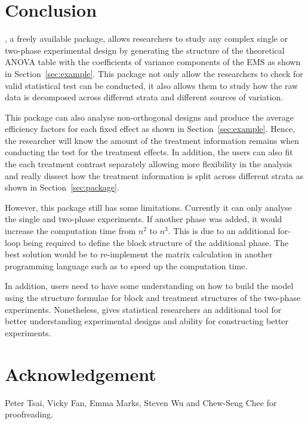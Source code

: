 \documentclass[article]{jss}
\begin{document}
\section[Conclusion]{Conclusion}
, a freely available  package, allows researchers to study any complex single or two-phase experimental design by generating the structure of the theoretical ANOVA table with the coefficients of variance components of the EMS as shown in Section~\ref{sec:example}. This package not only allow the researchers to check for valid statistical test can be conducted, it also allows them to study how the raw data is decomposed across different strata and different sources of variation.

This package can also analyse non-orthogonal designs and produce the average efficiency factors for each fixed effect as shown in Section~\ref{sec:example}. Hence, the researcher will know the amount of the treatment information remains when conducting the test for the treatment effects. In addition, the users can also fit the each treatment contrast separately allowing more flexibility in the analysis and really dissect how the treatment information is split across different strata as shown in Section~\ref{sec:package}.

However, this package still has some limitations. Currently it can only analyse the single and two-phase experiments. If another phase was added, it would increase the computation time from $n^2$ to $n^3$. This is due to an additional for-loop being required to define the block structure of the additional phase. The best solution would be to re-implement the matrix calculation in another programming language such as  to speed up the computation time.

In addition, users need to have some understanding on how to build the model using the structure formulae for block and treatment structures of the two-phase experiments. Nonetheless,  gives statistical researchers an additional tool for better understanding experimental designs and ability for constructing better experiments.

\section*{Acknowledgement}
Peter Tsai, Vicky Fan, Emma Marks, Steven Wu and Chew-Seng Chee for proofreading.


\end{document}

